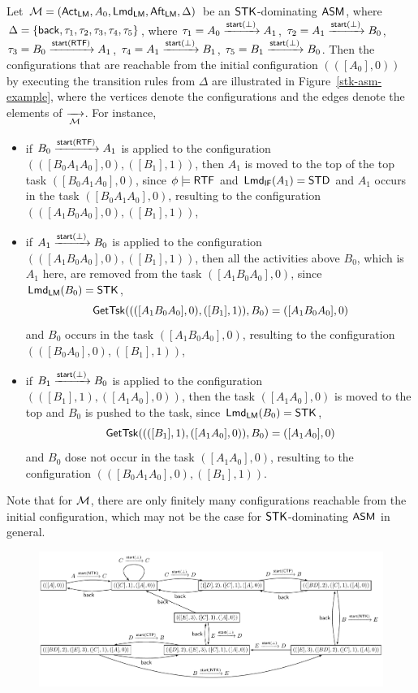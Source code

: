 \begin{example}
Let ${\mathcal{M} }=({\sf Act}_{\textsf{LM}},A_0,{\sf Lmd}_{\textsf{LM}},{\sf Aft}_{\textsf{LM}},\Delta)$ be an $\mathsf{STK}$-dominating $\textsf{ASM}$, where $\Delta = \{{\mathsf{back} },\tau_1, \tau_2, \tau_3, \tau_4, \tau_5\}$, where 
		$\tau_1 = A_0 \xrightarrow{{\mathsf{start} }(\bot)} A_1$,
		$\tau_2 = A_1 \xrightarrow{{\mathsf{start} }(\bot)} B_0$,
		$\tau_3 = B_0 \xrightarrow{{\mathsf{start} }({\sf RTF})} A_1$,
		$\tau_4 = A_1 \xrightarrow{{\mathsf{start} }(\bot)} B_1$,
		$\tau_5 = B_1 \xrightarrow{{\mathsf{start} }(\bot)} B_0$.
	Then the configurations that are reachable from the initial configuration $(([A_0], 0))$ by executing the transition rules from $\Delta$ are illustrated in Figure~\ref{stk-asm-example}, where the vertices denote the configurations and the edges denote the elements of $\xrightarrow[{\mathcal{M} }]{}$. 
	For instance, 
	\begin{itemize}
	\item if $B_0 \xrightarrow{{\mathsf{start} }({\sf RTF})} A_1$ is applied to the configuration $(([B_0A_1A_0],0),([B_1],1))$, then $A_1$ is moved to the top of the top task $([B_0A_1A_0],0)$, since $\phi\models{\sf RTF}$ and ${\sf Lmd}_{\textsf{IF}}(A_1) = \mathsf{STD}$ and $A_1$ occurs in the task $([B_0A_1A_0],0)$, resulting to the configuration $(([A_1B_0A_0],0),([B_1],1))$,
	\item if $A_1 \xrightarrow{{\mathsf{start} }(\bot)} B_0$ is applied to the configuration $(([A_1B_0A_0],0),([B_1],1))$, then all the activities above $B_0$, which is $A_1$ here, are removed from the task $([A_1B_0A_0],0)$, since ${\sf Lmd}_{\textsf{LM}}(B_0) = \mathsf{STK}$, 
	$$\mathsf{GetTsk}((([A_1B_0A_0],0),([B_1],1)), B_0) = ([A_1B_0A_0],0)$$
	and $B_0$ occurs in the task $([A_1B_0A_0],0)$, resulting to the configuration $(([B_0A_0],0),([B_1],1))$,
	\item if $B_1 \xrightarrow{{\mathsf{start} }(\bot)} B_0$ is applied to the configuration $(([B_1],1),([A_1A_0], 0))$, then the task $([A_1A_0], 0)$ is moved to the top and $B_0$ is pushed to the task,
	since ${\sf Lmd}_{\textsf{LM}}(B_0) = \mathsf{STK}$, 
	$$\mathsf{GetTsk}((([B_1],1),([A_1A_0], 0)), B_0) = ([A_1A_0], 0)$$
	and $B_0$ dose not occur in the task $([A_1A_0], 0)$, resulting to the configuration $(([B_0A_1A_0],0),([B_1],1))$.
	\end{itemize}
	Note that for ${\mathcal{M} }$, there are only finitely many configurations reachable from the initial configuration, which may not be the case for $\mathsf{STK}$-dominating $\textsf{ASM}$ in general.  
	\begin{figure}
			\centering
			\includegraphics[scale = 0.6]{stk-asm-example.pdf}

\end{figure}
\end{example}
